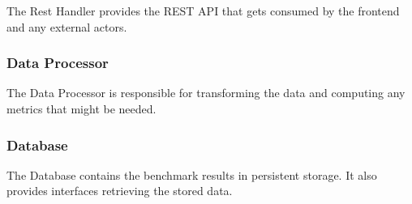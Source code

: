The Rest Handler provides the \gls{REST API} that gets consumed by the frontend and any external actors.

\subsubsection*{Data Processor}

The Data Processor is responsible for transforming the data and computing any metrics that might be needed.

\subsubsection*{Database}

The Database contains the \glspl{benchmark result} in persistent storage. It also provides interfaces retrieving the stored data.
